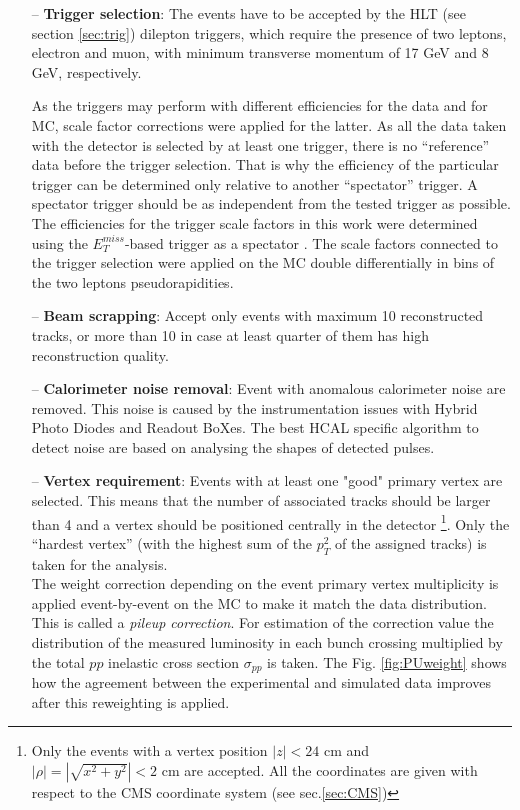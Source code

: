 \begin{itemize}
 \item [--] \textbf{Trigger selection}: The events have to be accepted by the HLT (see section \ref{sec:trig}) dilepton triggers, which require the presence of two leptons, electron and muon, with
 minimum transverse momentum of 17 GeV and 8 GeV, respectively.
 
 As the triggers may perform with different efficiencies for the data and for MC, scale factor corrections were applied for the latter. As all the data taken with 
 the detector is selected by at least one trigger, there is no ``reference'' data before the trigger selection. That is why the efficiency of the particular trigger 
 can be determined only relative to another ``spectator'' trigger. A spectator trigger should be as independent from the tested trigger as possible. The efficiencies 
 for the trigger scale factors in this work were determined using the $E_{T}^{miss}$-based trigger as a spectator \cite{Asin2014Auth}. The scale factors connected 
 to the trigger selection were applied on the MC double differentially in bins of the two leptons pseudorapidities. 
 \item [--] \textbf{Beam scrapping}: Accept only events with maximum 10 reconstructed tracks, or more than 10 in case at least quarter of them has high reconstruction 
 quality.
 \item [--] \textbf{Calorimeter noise removal}: Event with anomalous calorimeter noise are removed\cite{HCALNoise}. This noise is caused by the instrumentation issues with Hybrid 
 Photo Diodes and Readout BoXes. The best HCAL specific algorithm to detect noise are based on analysing the shapes of detected pulses.
 \item [--] \textbf{Vertex requirement}: Events with at least one "good" primary vertex are selected.
 This means that the number of associated tracks should be larger than 4 and a vertex should be positioned centrally in the detector
 \footnote{Only the events with a vertex position $|z| < \textrm{24 cm}$ and $|\rho| = |\sqrt{x^{2} + y^{2}}| < \textrm{2 cm}$ are accepted. All the coordinates
 are given with respect to the CMS coordinate system (see sec.\ref{sec:CMS})}. Only the ``hardest vertex'' 
 (with the highest sum of the $p_{T}^{2}$ of the assigned tracks) is taken for the analysis. 
 \\
 The weight correction depending on the event primary vertex multiplicity is applied
 event-by-event on the MC to make it match the data distribution. This is called a \textit{pileup correction}. For estimation of the correction value
 the distribution of the measured luminosity in each bunch crossing \cite{CMS:2012rua}
 multiplied by the total $pp$ inelastic cross section $\sigma_{pp}$ \cite{TWikiSystPU} is taken.
 The Fig. \ref{fig:PUweight} shows how the agreement
 between the experimental and simulated data improves after this reweighting is applied.
 

\end{itemize}
